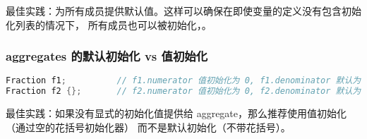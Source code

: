 \documentclass[../../LearnCpp.tex]{subfiles}
\begin{document}
最佳实践：为所有成员提供默认值。这样可以确保在即使变量的定义没有包含初始化列表的情况下，
所有成员也可以被初始化，。

\subsubsection*{aggregates 的默认初始化 vs 值初始化}

\begin{lstlisting}[language=C++]
Fraction f1;          // f1.numerator 值初始化为 0, f1.denominator 默认为 1
Fraction f2 {};       // f2.numerator 值初始化为 0, f2.denominator 默认为 1
\end{lstlisting}

最佳实践：如果没有显式的初始化值提供给 aggregate，那么推荐使用值初始化（通过空的花括号初始化器）
而不是默认初始化（不带花括号）。
\end{document}
